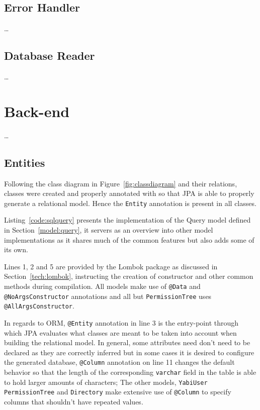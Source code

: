\subsection{Error Handler}
\dots
\subsection{Database Reader}
\dots

\section{Back-end}\label{cha:implementation:sec:back-end}
\dots

\subsection{Entities}
Following the class diagram in Figure~\ref{fig:classdiagram} and their relations, classes were created and properly annotated with so that \gls{JPA} is able to properly generate a relational model. Hence the \texttt{Entity} annotation is present in all classes.

Listing~\ref{code:sqlquery} presents the implementation of the Query model defined in Section~\ref{model:query}, it servers as an overview into other model implementations as it shares much of the common features but also adds some of its own.

Lines 1, 2 and 5 are provided by the Lombok package as discussed in Section~\ref{tech:lombok}, instructing the creation of constructor and other common methods during compilation. All models make use of \texttt{@Data} and \texttt{@NoArgsConstructor} annotations and all but \texttt{PermissionTree} uses \texttt{@AllArgsConstructor}.

In regards to \gls{ORM}, \texttt{@Entity} annotation in line 3 is the entry-point through which \gls{JPA} evaluates what classes are meant to be taken into account when building the relational model.
In general, some attributes need don't need to be declared as they are correctly inferred but in some cases it is desired to configure the generated database, \texttt{@Column} annotation on line 11 changes the default behavior so that the length of the corresponding \texttt{varchar} field in the table is able to hold larger amounts of characters; The other models, \texttt{YabiUser} \texttt{PermissionTree} and \texttt{Directory} make extensive use of \texttt{@Column} to specify columns that shouldn't have repeated values.

